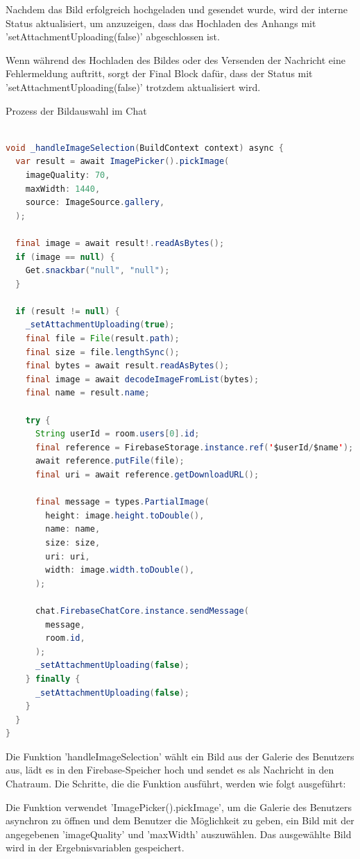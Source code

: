 Nachdem das Bild erfolgreich hochgeladen und gesendet wurde, wird der interne Status aktualisiert, um anzuzeigen, dass das Hochladen des Anhangs mit 'setAttachmentUploading(false)' abgeschlossen ist.

Wenn während des Hochladen des Bildes oder des Versenden der Nachricht eine Fehlermeldung auftritt, sorgt der Final Block dafür, dass der Status mit 'setAttachmentUploading(false)' trotzdem aktualisiert wird.

Prozess der Bildauswahl im Chat

\begin{lstlisting}[language=Java,caption=Prozess der Bildauswahl und -verarbeitung,label=lst:fotoSelektion]  

void _handleImageSelection(BuildContext context) async {
  var result = await ImagePicker().pickImage(
    imageQuality: 70,
    maxWidth: 1440,
    source: ImageSource.gallery,
  );

  final image = await result!.readAsBytes();
  if (image == null) {
    Get.snackbar("null", "null");
  }

  if (result != null) {
    _setAttachmentUploading(true);
    final file = File(result.path);
    final size = file.lengthSync();
    final bytes = await result.readAsBytes();
    final image = await decodeImageFromList(bytes);
    final name = result.name;

    try {
      String userId = room.users[0].id;
      final reference = FirebaseStorage.instance.ref('$userId/$name');
      await reference.putFile(file);
      final uri = await reference.getDownloadURL();

      final message = types.PartialImage(
        height: image.height.toDouble(),
        name: name,
        size: size,
        uri: uri,
        width: image.width.toDouble(),
      );

      chat.FirebaseChatCore.instance.sendMessage(
        message,
        room.id,
      );
      _setAttachmentUploading(false);
    } finally {
      _setAttachmentUploading(false);
    }
  }
}

\end{lstlisting}

Die Funktion 'handleImageSelection' wählt ein Bild aus der Galerie des Benutzers aus, lädt es in den Firebase-Speicher hoch und sendet es als Nachricht in den Chatraum. Die Schritte, die die Funktion ausführt, werden wie folgt ausgeführt:

Die Funktion verwendet 'ImagePicker().pickImage', um die Galerie des Benutzers asynchron zu öffnen und dem Benutzer die Möglichkeit zu geben, ein Bild mit der angegebenen 'imageQuality' und 'maxWidth' auszuwählen. Das ausgewählte Bild wird in der Ergebnisvariablen gespeichert.

